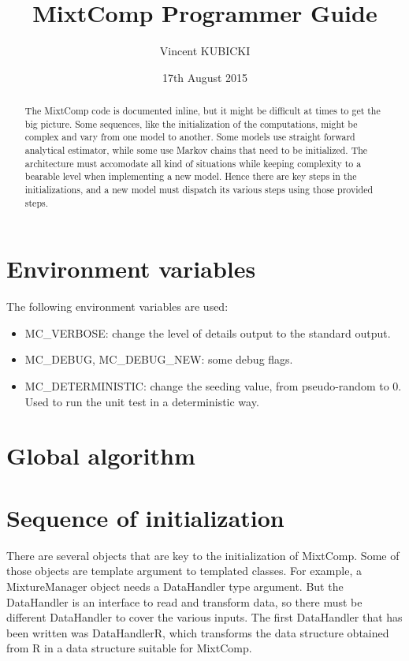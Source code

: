 \documentclass{article}
\title{MixtComp Programmer Guide}
\author{Vincent KUBICKI}
\date{17th August 2015}
\begin{document}
\maketitle
\tableofcontents

\begin{abstract}

The MixtComp code is documented inline, but it might be difficult at times to get the big picture. Some sequences, like the initialization of the computations, might be complex and vary from one model to another. Some models use straight forward analytical estimator, while some use Markov chains that need to be initialized. The architecture must accomodate all kind of situations while keeping complexity to a bearable level when implementing a new model. Hence there are key steps in the initializations, and a new model must dispatch its various steps using those provided steps.

\end{abstract}

\section{Environment variables}

The following environment variables are used:

\begin{itemize}
	\item MC{\_}VERBOSE: change the level of details output to the standard output.
	\item MC{\_}DEBUG, MC{\_}DEBUG{\_}NEW:  some debug flags.
	\item MC{\_}DETERMINISTIC: change the seeding value, from pseudo-random to 0. Used to run the unit test in a deterministic way.
\end{itemize}

\section{Global algorithm}

\section{Sequence of initialization}

There are several objects that are key to the initialization of MixtComp. Some of those objects are template argument to templated classes. For example, a MixtureManager object needs a DataHandler type argument. But the DataHandler is an interface to read and transform data, so there must be different DataHandler to cover the various inputs. The first DataHandler that has been written was DataHandlerR, which transforms the data structure obtained from R in a data structure suitable for MixtComp.
\end{document}
